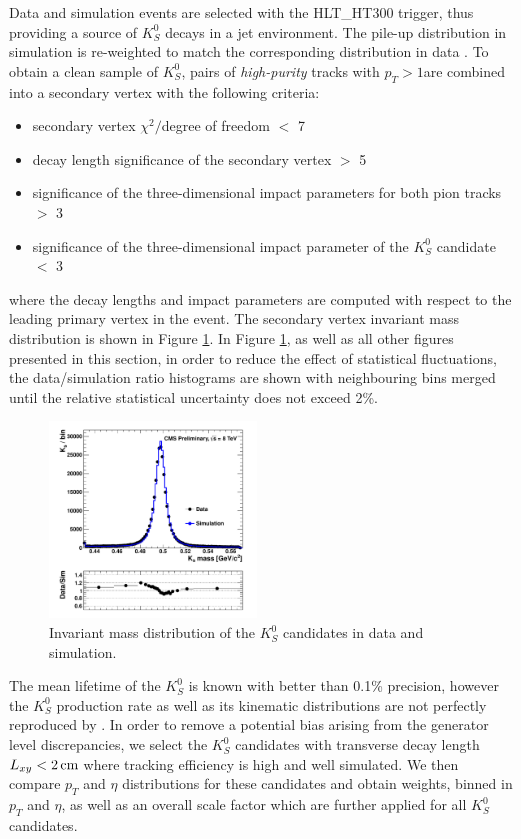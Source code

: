 Data and simulation events are selected with the HLT\_HT300 trigger, thus providing
a source of $K^0_S$ decays in a jet environment. The pile-up distribution in simulation is re-weighted
to match the corresponding distribution in data \cite{PileUp}. 
To obtain a clean sample of $K^0_S$, pairs of {\it high-purity} tracks with $p_T>1$\GeVc are combined
 into a secondary 
vertex with the following criteria:
\begin{itemize}
 \item secondary vertex $\chi^2/$degree of freedom $<$ 7
 \item decay length significance of the secondary vertex $>$ 5
 \item significance of the three-dimensional impact parameters for both pion tracks $>$ 3
 \item significance of the three-dimensional impact parameter of the $K^0_S$ candidate $<$ 3 
\end{itemize}
where the decay lengths and impact parameters are computed with respect to the leading primary vertex
in the event.
The secondary vertex invariant mass distribution is shown in Figure \ref{fig:ksmass}. 
In Figure \ref{fig:ksmass}, as well as all other figures
presented in this section, in order to reduce the effect of statistical fluctuations, 
the data/simulation ratio histograms are shown with neighbouring bins merged until the
relative statistical uncertainty does not exceed 2\%. 

\begin{figure}[htbp]
\centering
\includegraphics[width=0.49\textwidth]{plots/kshort/ksmass.pdf}
\caption{Invariant mass distribution of the $K^0_S$ candidates in data and simulation. \label{fig:ksmass}}
\end{figure} 


The mean lifetime of the $K^0_S$ is known with better than 0.1\% precision, however the $K^0_S$
production rate as well as its kinematic distributions are not perfectly reproduced 
by \PYTHIA \cite{Khachatryan:2011tm}.
In order to remove a potential bias arising from the generator level discrepancies, 
we select the $K^0_S$ candidates with transverse decay length $L_{xy}<2\,\text{cm}$ where tracking efficiency
is high and well simulated. We then compare $p_T$ and $\eta$ distributions for these candidates and obtain
weights, binned in $p_T$ and $\eta$, as well as an overall scale factor which are further
 applied for all $K^0_S$ candidates. 

